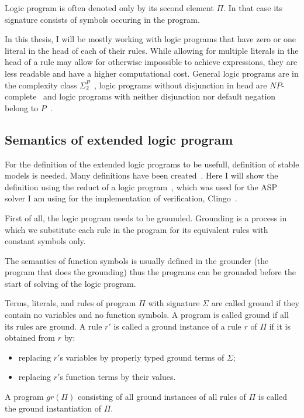 Logic program is often denoted only by its second element $\Pi$.
In that case its signature consists of symbols occuring in the program.

In this thesis, I will be mostly working with logic programs that have
zero or one literal in the head of each of their rules.
While allowing for multiple literals in the head of a rule may allow
for otherwise impossible to achieve expressions, they are less readable
and have a higher computational cost.
General logic programs are in the complexity class $\Sigma_2^P$~\cite{dis_datalog_complexity},
logic programs without disjunction in head are $NP$-complete~\cite{schlipf1995_computation}
and logic programs with neither disjunction nor default negation belong to $P$~\cite{KRHandbook}.


\subsection{Semantics of extended logic program}

For the definition of the extended logic programs to be usefull,
definition of stable models is needed.
Many definitions have been created~\cite{12definitions}.
Here I will show the definition using the reduct
of a logic program~\cite{KRHandbook},
which was used for the ASP solver I am using for the implementation
of verification, Clingo~\cite{GebserKKS17}.

First of all, the logic program needs to be grounded.
Grounding is a process in which we substitute each rule
in the program for its equivalent rules with constant symbols only.

The semantics of function symbols is usually defined in the groun\-d\-er
(the program that does the grounding)
thus the programs can be grounded before the start of solving
of the logic program.

\begin{definition}
    Terms, literals, and rules of program $\Pi$ with signature $\Sigma$ are called ground if they
    contain no variables and no function symbols. A program is called
    ground if all its rules are ground. A rule $r'$ is called a ground instance of a rule $r$ of $\Pi$
    if it is obtained from $r$ by:
    \begin{itemize}
        \item replacing $r'$s variables by properly typed ground terms of $\Sigma$;
        \item replacing $r'$s function terms by their values.
    \end{itemize}
    A program $gr(\Pi)$ consisting of all ground instances of all rules of $\Pi$
    is called the ground instantiation of $\Pi$.
\end{definition}

